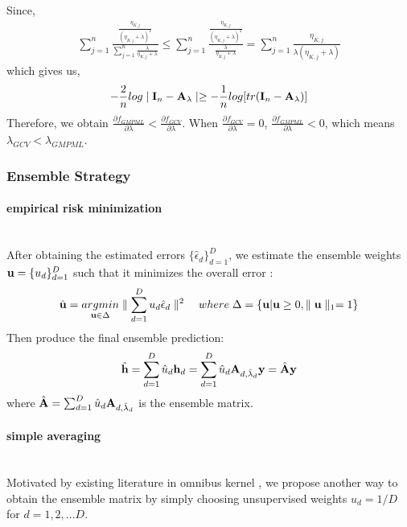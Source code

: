 \documentclass[11pt]{article}
\begin{document}
Since,
\begin{align*}
\sum_{j=1}^n\frac{\frac{\eta_{K, j}}{(\eta_{K, j}+\lambda)^2}}{\sum_{j=1}^n\frac{\lambda}{\eta_{K, j}+\lambda}}\leq \sum_{j=1}^n\frac{\frac{\eta_{K, j}}{(\eta_{K, j}+\lambda)^2}}{\frac{\lambda}{\eta_{K, j}+\lambda}}=\sum_{j=1}^n\frac{\eta_{K, j}}{\lambda(\eta_{K, j}+\lambda)}
\end{align*}
which gives us,
\begin{align*}
-\frac{2}{n}log\mid {\bf I}_n-{\bf A}_\lambda\mid \geq -\frac{1}{n}log[tr({\bf I}_n-{\bf A}_\lambda)]
\end{align*}
Therefore, we obtain $\frac{\partial f_{GMPML}}{\partial \lambda}<\frac{\partial f_{GCV}}{\partial \lambda}$. When $\frac{\partial f_{GCV}}{\partial \lambda}=0$, $\frac{\partial f_{GMPML}}{\partial \lambda}<0$, which means $\lambda_{GCV}<\lambda_{GMPML}$.



\subsubsection{{Ensemble Strategy}}

\paragraph{empirical risk minimization}\mbox{}\\
After obtaining the estimated errors $\{\hat{\epsilon}_d\}_{d=1}^D$, we estimate the ensemble weights ${\bf u}=\{u_d\}_{d=1}^D$ such that it minimizes the overall error \citep{liu_robust_2017}:
\begin{align*}
\hat{{\bf u}}=\underset{{\bf u} \in \Delta}{argmin}\parallel \sum_{d=1}^Du_d\hat{\epsilon}_d\parallel^2 \quad where\; \Delta=\{{\bf u} | {\bf u} \geq 0, \parallel {\bf u} \parallel_1=1\}
\end{align*}
Then produce the final ensemble prediction:
\begin{align*}
\hat{{\bf h}}=\sum_{d=1}^D \hat{u}_d {\bf h}_d=\sum_{d=1}^D \hat{u}_d {\bf A}_{d,\hat{\lambda}_d}{\bf y}=\hat{{\bf A}}{\bf y}
\end{align*}
where $\hat{{\bf A}}=\sum_{d=1}^D \hat{u}_d {\bf A}_{d,\hat{\lambda}_d}$ is the ensemble matrix.

\paragraph{simple averaging}\mbox{}\\
Motivated by existing literature in omnibus kernel \citep{zhan_fast_2017}, we propose another way to obtain the ensemble matrix by simply choosing unsupervised weights $u_d=1/D$ for $d=1,2,...D$.
\end{document}
